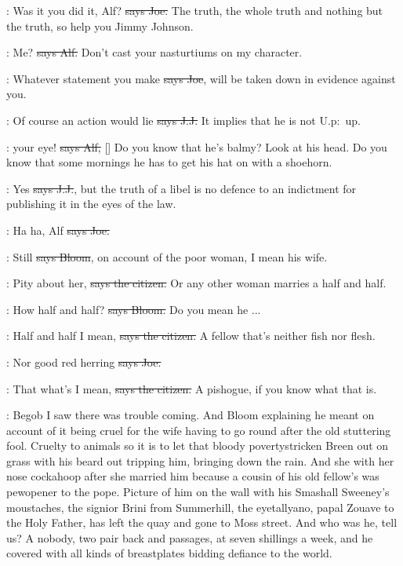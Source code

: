 \joe:
Was it you did it,
Alf?
\sout{says Joe.}
The truth,
the whole truth and nothing
but the truth,
so help you Jimmy Johnson.

\bergan:
Me?
\sout{says Alf.}
Don't cast your nasturtiums on my character.

\joe:
Whatever statement you make
\sout{says Joe},
will be taken down in evidence
against you.

\jjom:
Of course an action would lie
\sout{says J.J.}
It implies that he is not
U.p:~up.

\bergan:
 your eye!
\sout{says Alf,} []
Do you know that he's balmy?
Look at his head.
Do you know that some mornings he has to get his hat on
with a shoehorn.

\jjom:
Yes
\sout{says J.J.},
but the truth of a libel is no defence to an indictment
for publishing it in the eyes of the law.

\joe:
Ha ha,
Alf
\sout{says Joe.}

\Bloom:
Still
\sout{says Bloom},
on account of the poor woman,
I mean his wife.

\citizen:
Pity about her,
\sout{says the citizen.}
Or any other woman marries a half and half.

\Bloom:
How half and half?
\sout{says Bloom.}
Do you mean he ...

\citizen:
Half and half I mean,
\sout{says the citizen.}
A fellow that's neither fish nor flesh.

\joe:
Nor good red herring
\sout{says Joe.}

\citizen:
That what's I mean,
\sout{says the citizen.}
A pishogue,
if you know what that is.

\Nq:
Begob I saw there was trouble coming.
And Bloom explaining he meant on
account of it being cruel for the wife having to go round after the
old stuttering fool.
Cruelty to animals so it is to let that bloody
povertystricken Breen out on grass with his beard out tripping him,
bringing down the rain.
And she with her nose cockahoop after she married
him because a cousin of his old fellow's was pewopener to the pope.
Picture of him on the wall with his Smashall Sweeney's moustaches,
the
signior Brini from Summerhill,
the eyetallyano,
papal Zouave to the Holy
Father,
has left the quay and gone to Moss street.
And who was he,
tell
us?
A nobody,
two pair back and passages,
at seven shillings a week,
and
he covered with all kinds of breastplates
bidding defiance to the world.

